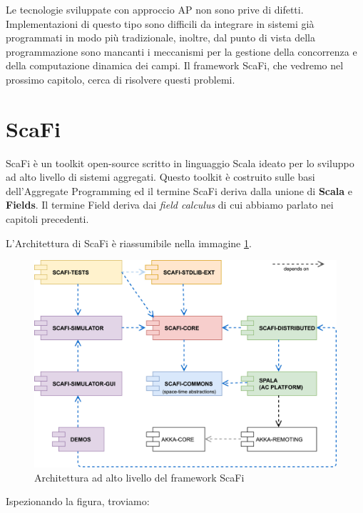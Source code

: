 \documentclass[12pt,a4paper,openright,twoside]{book}
\begin{document}
Le tecnologie sviluppate con approccio \ac{AP} non sono prive di difetti. 
Implementazioni di questo tipo sono difficili da integrare in sistemi già programmati in modo più tradizionale, inoltre, dal punto di vista della programmazione sono mancanti i meccanismi per la gestione della concorrenza e della computazione dinamica dei campi. Il framework ScaFi, che vedremo nel prossimo capitolo, cerca di risolvere questi problemi.


\section{ScaFi}

ScaFi è un toolkit open-source scritto in linguaggio Scala ideato per lo sviluppo ad alto livello di sistemi aggregati. Questo toolkit è costruito sulle basi dell'Aggregate Programming ed il termine ScaFi deriva dalla unione di \textbf{Scala} e \textbf{Fields}. Il termine Field deriva dai \textit{field calculus} di cui abbiamo parlato nei capitoli precedenti.

L'Architettura di ScaFi \cite{Casadei2022} è riassumibile nella immagine \cref{fig:scafi-arc}.

\begin{figure}
    \centering
    \includegraphics[width=.8\linewidth]{figures/scafi-arc.jpg}
    \caption{Architettura ad alto livello del framework ScaFi}
    \label{fig:scafi-arc}
\end{figure}

Ispezionando la figura, troviamo:
\end{document}
